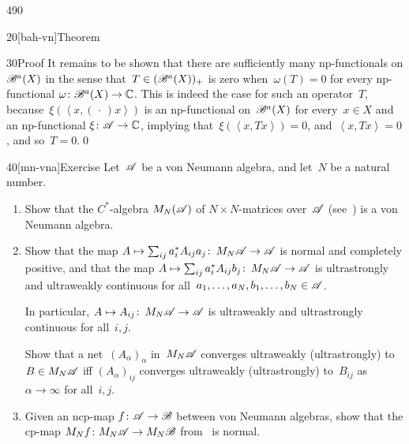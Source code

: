 \begin{parsec}{490}
\begin{point}{20}[bah-vn]{Theorem}
\begin{point}{30}{Proof}
It remains to be shown that
there are sufficiently many np-functionals on $\mathscr{B}^a(X)$
in the sense that~$T\in(\mathscr{B}^a(X))_+$ is zero
when~$\omega(T)=0$ for every np-functional $\omega\colon \mathscr{B}^a(X)\to\mathbb{C}$.
This is indeed
the case for such an operator~$T$,
because~$\xi(\left<x,(\,\cdot\,)x\right>)$
is an np-functional on~$\mathscr{B}^a(X)$
for every~$x\in X$
and an np-functional $\xi\colon \mathscr{A}\to\mathbb{C}$,
implying that~$\xi(\left<x,Tx\right>)=0$,
and~$\left<x,Tx\right>=0$,
and so~$T=0$.\qed
\end{point}
\end{point}
\begin{point}{40}[mn-vna]{Exercise}%
%
Let~$\mathscr{A}$ be a von Neumann algebra,
and let~$N$ be a natural number.
\begin{enumerate}
\item
Show 
that the $C^*$-algebra
$M_N(\mathscr{A})$ of $N\times N$-matrices over~$\mathscr{A}$ (see~)
is a von Neumann algebra.
\item
Show that
the map $A\mapsto \sum_{ij} a_i^* A_{ij} a_j\colon\, M_N\mathscr{A}\to \mathscr{A}$
is normal and completely positive,
and that
the map $A\mapsto \sum_{ij} a_i^* A_{ij} b_j\colon\, M_N\mathscr{A}\to\mathscr{A}$
is ultrastrongly and ultraweakly continuous
for all~$a_1,\dotsc,a_N,b_1,\dotsc,b_N\in\mathscr{A}$.

In particular, $A\mapsto A_{ij}\colon\,M_N\mathscr{A}\to\mathscr{A}$
is ultraweakly and ultrastrongly continuous
for all~$i,j$.

Show that a net~$(A_\alpha)_\alpha$
in~$M_N\mathscr{A}$
converges ultraweakly (ultrastrongly)
to $B\in M_N\mathscr{A}$
iff $(A_\alpha)_{ij}$ converges ultraweakly (ultrastrongly)
to~$B_{ij}$ as~$\alpha\to\infty$ for all~$i,j$.
\item
Given an ncp-map $f\colon \mathscr{A}\to\mathscr{B}$
between von Neumann algebras,
show that the cp-map $M_N f\colon M_N\mathscr{A}\to M_N\mathscr{B}$
from~ is normal.%
\end{enumerate}
\end{point}
\end{parsec}
